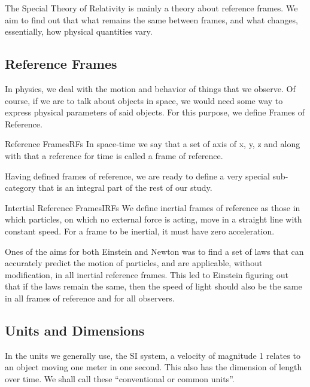 \documentclass[12pt]{article}
\numberwithin{equation}{section}
\theoremstyle{plain}
\theoremstyle{definition}
\begin{document}
The Special Theory of Relativity is mainly a theory about reference frames. We aim to find out that what remains the same between frames, and what changes, essentially, how physical quantities vary.

\subsection{Reference Frames}
\label{sec:RFs}

In physics, we deal with the motion and behavior of things that we observe. Of course, if we are to talk about objects in space, we would need some way to express physical parameters of said objects. For this purpose, we define Frames of Reference.

\begin{defn}{Reference Frames}{RFs}
    In space-time we say that a set of axis of x, y, z and along with that a reference for time is called a frame of reference.
\end{defn}

Having defined frames of reference, we are ready to define a very special sub-category that is an integral part of the rest of our study.

\begin{defn}{Intertial Reference Frames}{IRFs}
    We define inertial frames of reference as those in which particles, on which no external force is acting, move in a straight line with constant speed. For a frame to be inertial, it must have zero acceleration.
\end{defn}

Ones of the aims for both Einstein and Newton was to find a set of laws that can accurately predict the motion of particles, and are applicable, without modification, in all inertial reference frames. This led to Einstein figuring out that if the laws remain the same, then the speed of light should also be the same in all frames of reference and for all observers.

\subsection*{Units and Dimensions}

In the units we generally use, the SI system, a velocity of magnitude 1 relates to an object moving one meter in one second. This also has the dimension of length over time. We shall call these ``conventional or common units''.
\end{document}
